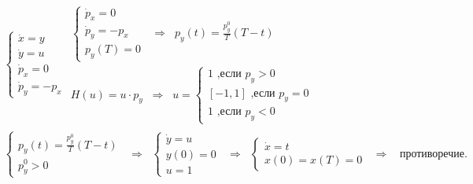 \documentclass[a4paper,12pt]{article}
\begin{document}
\begin{align*}
        &\left\{
        \begin{array}{l}
            {\dot x}=y
            \\
            {\dot y}=u
            \\
            \dot p_x = 0
            \\
            \dot p_y = -p_x 
        \end{array}
        \right.
        \begin{array}{l}
            \left\{
            \begin{array}{l}
                \dot p_x = 0
                \\
                \dot p_y = -p_x 
                \\
                p_y(T)=0
            \end{array}
            \right.
            \;\;\Rightarrow \;\;
            p_y(t)=\frac{p_y^0}{T}(T-t)
            \\
            H(u)=u \cdot p_y \;\;\Rightarrow\;\; u=
            \left\{
            \begin{array}{l}
                1 \text{ ,если } p_y>0
                \\
                \left[-1,1\right] \text{ ,если } p_y=0
                \\
                1 \text{ ,если } p_y<0
            \end{array}
            \right.
        \end{array}
        \\
        &\left\{
        \begin{array}{l}
            p_y(t)=\frac{p_y^0}{T}(T-t)
            \\
            p_y^0>0
        \end{array}
        \right.
        \;\;\Rightarrow\;\;
        \left\{
        \begin{array}{l}
            {\dot y}=u
            \\
            y(0)=0
            \\
            u=1
        \end{array}
        \right.
        \;\;\Rightarrow\;\;
        \left\{
        \begin{array}{l}
            {\dot x}=t
            \\
            x(0)=x(T)=0
        \end{array}
        \right.
        \;\;\Rightarrow\;\;
        \text{ противоречие.}

\end{align*}
\end{document}
